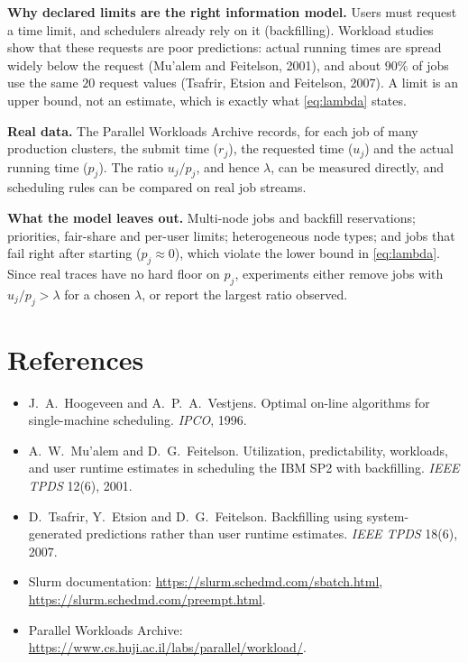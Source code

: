 \documentclass[11pt]{article}
\begin{document}
\noindent\textbf{Why declared limits are the right information model.}
Users must request a time limit, and schedulers already rely on it (backfilling). Workload studies
show that these requests are poor predictions: actual running times are spread widely below the
request (Mu'alem and Feitelson, 2001), and about $90\%$ of jobs use the same $20$ request values
(Tsafrir, Etsion and Feitelson, 2007). A limit is an upper bound, not an estimate, which is exactly
what \eqref{eq:lambda} states.

\medskip
\noindent\textbf{Real data.}
The Parallel Workloads Archive records, for each job of many production clusters, the submit time
($r_j$), the requested time ($u_j$) and the actual running time ($p_j$). The ratio $u_j/p_j$, and
hence $\lambda$, can be measured directly, and scheduling rules can be compared on real job streams.

\medskip
\noindent\textbf{What the model leaves out.}
Multi-node jobs and backfill reservations; priorities, fair-share and per-user limits; heterogeneous
node types; and jobs that fail right after starting ($p_j\approx 0$), which violate the lower bound
in \eqref{eq:lambda}. Since real traces have no hard floor on $p_j$, experiments either remove jobs
with $u_j/p_j>\lambda$ for a chosen $\lambda$, or report the largest ratio observed.

\section*{References}
\begin{itemize}[leftmargin=*]
  \item J.~A.~Hoogeveen and A.~P.~A.~Vestjens. Optimal on-line algorithms for single-machine
        scheduling. \emph{IPCO}, 1996.
  \item A.~W.~Mu'alem and D.~G.~Feitelson. Utilization, predictability, workloads, and user runtime
        estimates in scheduling the IBM SP2 with backfilling. \emph{IEEE TPDS} 12(6), 2001.
  \item D.~Tsafrir, Y.~Etsion and D.~G.~Feitelson. Backfilling using system-generated predictions
        rather than user runtime estimates. \emph{IEEE TPDS} 18(6), 2007.
  \item Slurm documentation: \url{https://slurm.schedmd.com/sbatch.html},
        \url{https://slurm.schedmd.com/preempt.html}.
  \item Parallel Workloads Archive: \url{https://www.cs.huji.ac.il/labs/parallel/workload/}.
\end{itemize}
\end{document}
